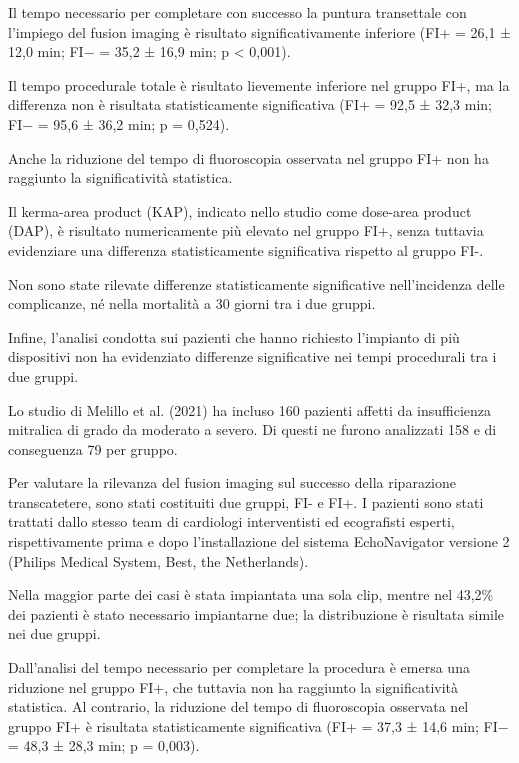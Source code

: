 \documentclass[12pt,a4paper,twoside]{article}
\begin{document}
Il tempo necessario per completare con successo la puntura transettale con l'impiego del fusion imaging è risultato significativamente inferiore (FI+ = 26,1 ± 12,0 min; FI− = 35,2 ± 16,9 min; p \textless{} 0,001). \cite{ref25}

Il tempo procedurale totale è risultato lievemente inferiore nel gruppo FI+, ma la differenza non è risultata statisticamente significativa (FI+ = 92,5 ± 32,3 min; FI− = 95,6 ± 36,2 min; p = 0,524). \cite{ref25}

Anche la riduzione del tempo di fluoroscopia osservata nel gruppo FI+ non ha raggiunto la significatività statistica. \cite{ref25}

Il kerma-area product (KAP), indicato nello studio come dose-area product (DAP), è risultato numericamente più elevato nel gruppo FI+, senza tuttavia evidenziare una differenza statisticamente significativa rispetto al gruppo FI-. \cite{ref25}

Non sono state rilevate differenze statisticamente significative nell'incidenza delle complicanze, né nella mortalità a 30 giorni tra i due gruppi. \cite{ref25}

Infine, l'analisi condotta sui pazienti che hanno richiesto l'impianto di più dispositivi non ha evidenziato differenze significative nei tempi procedurali tra i due gruppi. \cite{ref25}

Lo studio di Melillo et al. (2021) ha incluso 160 pazienti affetti da insufficienza mitralica di grado da moderato a severo. Di questi ne furono analizzati 158 e di conseguenza 79 per gruppo. \cite{ref26}

Per valutare la rilevanza del fusion imaging sul successo della riparazione transcatetere, sono stati costituiti due gruppi, FI- e FI+. I pazienti sono stati trattati dallo stesso team di cardiologi interventisti ed ecografisti esperti, rispettivamente prima e dopo l'installazione del sistema EchoNavigator versione 2 (Philips Medical System, Best, the Netherlands). \cite{ref26}

Nella maggior parte dei casi è stata impiantata una sola clip, mentre nel 43,2\% dei pazienti è stato necessario impiantarne due; la distribuzione è risultata simile nei due gruppi. \cite{ref26}

Dall'analisi del tempo necessario per completare la procedura è emersa una riduzione nel gruppo FI+, che tuttavia non ha raggiunto la significatività statistica. Al contrario, la riduzione del tempo di fluoroscopia osservata nel gruppo FI+ è risultata statisticamente significativa (FI+ = 37,3 ± 14,6 min; FI− = 48,3 ± 28,3 min; p = 0,003). \cite{ref26}
\end{document}
